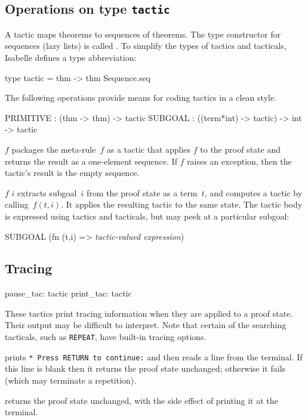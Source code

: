 \subsection{Operations on type {\tt tactic}}
 A tactic maps theorems to sequences of
theorems.  The type constructor for sequences (lazy lists) is called
.  To simplify the types of tactics and tacticals,
Isabelle defines a type abbreviation:
\begin{ttbox} 
type tactic = thm -> thm Sequence.seq
\end{ttbox} 
The following operations provide means for coding tactics in a clean style.
\begin{ttbox} 
PRIMITIVE :                  (thm -> thm) -> tactic  
SUBGOAL   : ((term*int) -> tactic) -> int -> tactic
\end{ttbox} 
\begin{ttdescription}
\item[\ttindexbold{PRIMITIVE} $f$] packages the meta-rule~$f$ as a tactic that
  applies $f$ to the proof state and returns the result as a one-element
  sequence.  If $f$ raises an exception, then the tactic's result is the empty
  sequence.

\item[\ttindexbold{SUBGOAL} $f$ $i$] 
extracts subgoal~$i$ from the proof state as a term~$t$, and computes a
tactic by calling~$f(t,i)$.  It applies the resulting tactic to the same
state.  The tactic body is expressed using tactics and tacticals, but may
peek at a particular subgoal:
\begin{ttbox} 
SUBGOAL (fn (t,i) => {\it tactic-valued expression})
\end{ttbox} 
\end{ttdescription}


\subsection{Tracing}
\begin{ttbox} 
pause_tac: tactic
print_tac: tactic
\end{ttbox}
These tactics print tracing information when they are applied to a proof
state.  Their output may be difficult to interpret.  Note that certain of
the searching tacticals, such as {\tt REPEAT}, have built-in tracing
options.
\begin{ttdescription}
\item[\ttindexbold{pause_tac}] 
prints {\footnotesize\tt** Press RETURN to continue:} and then reads a line
from the terminal.  If this line is blank then it returns the proof state
unchanged; otherwise it fails (which may terminate a repetition).

\item[\ttindexbold{print_tac}] 
returns the proof state unchanged, with the side effect of printing it at
the terminal.
\end{ttdescription}



